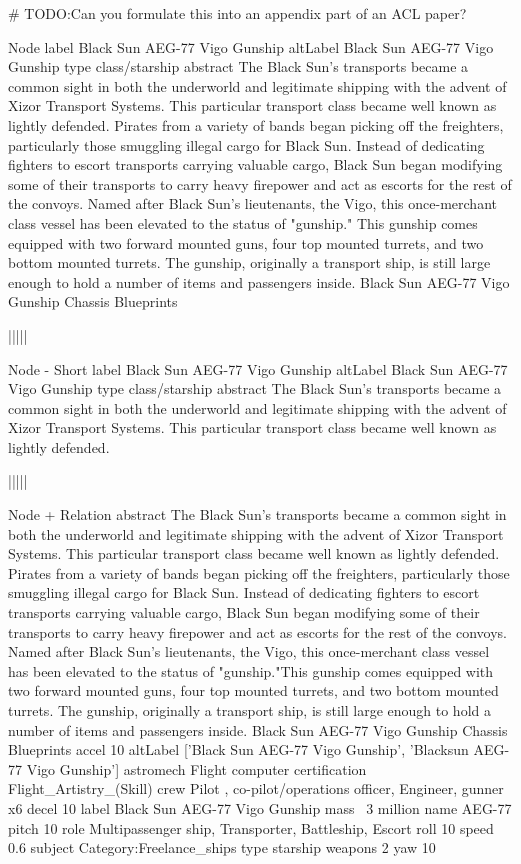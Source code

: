 \documentclass[11pt]{article}
\begin{document}
\# TODO:Can you formulate this into an appendix part of an ACL paper?

Node
label	Black Sun AEG-77 Vigo Gunship
altLabel	Black Sun AEG-77 Vigo Gunship
type	class/starship
abstract	The Black Sun's transports became a common sight in both the underworld and legitimate shipping with the advent of Xizor Transport Systems. This particular transport class became well known as lightly defended. Pirates from a variety of bands began picking off the freighters, particularly those smuggling illegal cargo for Black Sun. Instead of dedicating fighters to escort transports carrying valuable cargo, Black Sun began modifying some of their transports to carry heavy firepower and act as escorts for the rest of the convoys. Named after Black Sun's lieutenants, the Vigo, this once-merchant class vessel has been elevated to the status of "gunship."
This gunship comes equipped with two forward mounted guns, four top mounted turrets, and two bottom mounted turrets. The gunship, originally a transport ship, is still large enough to hold a number of items and passengers inside. Black Sun AEG-77 Vigo Gunship Chassis Blueprints


|||||

Node - Short
label	Black Sun AEG-77 Vigo Gunship
altLabel	Black Sun AEG-77 Vigo Gunship
type	class/starship
abstract	The Black Sun's transports became a common sight in both the underworld and legitimate shipping with the advent of Xizor Transport Systems. This particular transport class became well known as lightly defended.


|||||

Node + Relation
abstract	The Black Sun's transports became a common sight in both the underworld and legitimate shipping with the advent of Xizor Transport Systems. This particular transport class became well known as lightly defended. Pirates from a variety of bands began picking off the freighters, particularly those smuggling illegal cargo for Black Sun. Instead of dedicating fighters to escort transports carrying valuable cargo, Black Sun began modifying some of their transports to carry heavy firepower and act as escorts for the rest of the convoys. Named after Black Sun's lieutenants, the Vigo, this once-merchant class vessel has been elevated to the status of "gunship."This gunship comes equipped with two forward mounted guns, four top mounted turrets, and two bottom mounted turrets. The gunship, originally a transport ship, is still large enough to hold a number of items and passengers inside. Black Sun AEG-77 Vigo Gunship Chassis Blueprints
accel	10
altLabel	['Black Sun AEG-77 Vigo Gunship', 'Blacksun AEG-77 Vigo Gunship']
astromech	Flight computer
certification	Flight\_Artistry\_(Skill)
crew	Pilot , co-pilot/operations officer, Engineer, gunner x6
decel	10
label	Black Sun AEG-77 Vigo Gunship
mass	~3 million
name	AEG-77
pitch	10
role	Multipassenger ship, Transporter, Battleship, Escort
roll	10
speed	0.6
subject	Category:Freelance\_ships
type	starship
weapons	2
yaw	10
\end{document}
